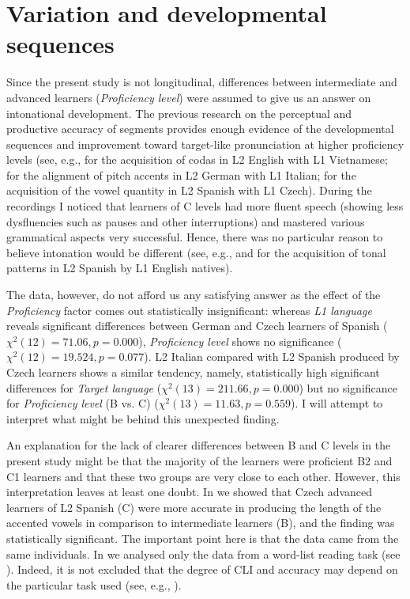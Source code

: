 \section{Variation and developmental sequences}\label{sec:5.4} %

Since the present study is not longitudinal, differences between intermediate and advanced learners (\textit{Proficiency level}) were assumed to give us an answer on intonational development. The previous research on the perceptual and productive accuracy of segments provides enough evidence of the developmental sequences and improvement toward target-like pronunciation at higher proficiency levels (see, e.g., \citealt{Hansen2004} for the acquisition of codas in L2 English with L1 Vietnamese; \citealt{Stella2012} for the alignment of pitch accents in L2 German with L1 Italian; \citealt{PeškováEtAl2017} for the acquisition of the vowel quantity in L2 Spanish with L1 Czech). During the recordings I noticed that learners of C levels had more fluent speech (showing less dysfluencies such as pauses and other interruptions) and mastered various grammatical aspects very successful. Hence, there was no particular reason to believe intonation would be different (see, e.g., \citealt{Trimble2013} and \citealt{Zárate-Sández2015} for the acquisition of tonal patterns in L2 Spanish by L1 English natives).


The data, however, do not afford us any satisfying answer as the effect of the \textit{Proficiency} factor comes out statistically insignificant: whereas \textit{L1 language} reveals significant differences between German and Czech learners of Spanish ($\chi^2(12) = 71.06,\allowbreak p = 0.000$), \textit{Proficiency level} shows no significance ($\chi^2(12) = 19.524,\allowbreak p = 0.077$). L2 Italian compared with L2 Spanish produced by Czech learners shows a similar tendency, namely, statistically high significant differences for \textit{Target language} ($\chi^2(13) = 211.66,\allowbreak p = 0.000$) but no significance for \textit{Proficiency level} (B vs. C) ($\chi^2(13) = 11.63,\allowbreak p = 0.559$). I will attempt to interpret what might be behind this unexpected finding.



An explanation for the lack of clearer differences between B and C levels in the present study might be that the majority of the learners were proficient B2 and C1 learners and that these two groups are very close to each other. However, this interpretation leaves at least one doubt. In \citet{PeškováEtAl2017} we showed that Czech advanced learners of L2 Spanish (C) were more accurate in producing the length of the accented vowels in comparison to intermediate learners (B), and the finding was statistically significant. The important point here is that the data came from the same individuals. In \citet{PeškováEtAl2017} we analysed only the data from a word-list reading task (see ). Indeed, it is not excluded that the degree of CLI and accuracy may depend on the particular task used (see, e.g., \citealt{ColantoniEtAl2016b}).



